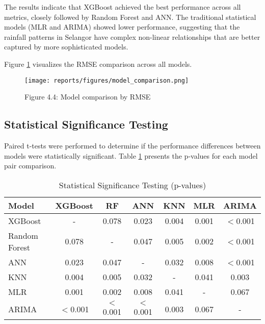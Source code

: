 \documentclass[12pt]{article}
\begin{document}
The results indicate that XGBoost achieved the best performance across all metrics, closely followed by Random Forest and ANN. The traditional statistical models (MLR and ARIMA) showed lower performance, suggesting that the rainfall patterns in Selangor have complex non-linear relationships that are better captured by more sophisticated models.

Figure \ref{fig:chap4_fig4_model_comparison_rmse} visualizes the RMSE comparison across all models.

\begin{figure}[h]
\centering
\texttt{[image: reports/figures/model\_comparison.png]}
\caption{Figure 4.4: Model comparison by RMSE}
\label{fig:chap4_fig4_model_comparison_rmse}
\end{figure}

\subsection{Statistical Significance Testing}
\label{subsec:significance_results}

Paired t-tests were performed to determine if the performance differences between models were statistically significant. Table \ref{tab:significance_testing} presents the p-values for each model pair comparison.

\begin{table}[h]
\centering
\caption{Statistical Significance Testing (p-values)}
\label{tab:significance_testing}
\begin{tabular}{|l|c|c|c|c|c|c|}
\hline
\textbf{Model} & \textbf{XGBoost} & \textbf{RF} & \textbf{ANN} & \textbf{KNN} & \textbf{MLR} & \textbf{ARIMA} \\
\hline
XGBoost & - & 0.078 & 0.023 & 0.004 & 0.001 & $<$0.001 \\
\hline
Random Forest & 0.078 & - & 0.047 & 0.005 & 0.002 & $<$0.001 \\
\hline
ANN & 0.023 & 0.047 & - & 0.032 & 0.008 & $<$0.001 \\
\hline
KNN & 0.004 & 0.005 & 0.032 & - & 0.041 & 0.003 \\
\hline
MLR & 0.001 & 0.002 & 0.008 & 0.041 & - & 0.067 \\
\hline
ARIMA & $<$0.001 & $<$0.001 & $<$0.001 & 0.003 & 0.067 & - \\
\hline
\end{tabular}
\end{table}
\end{document}
